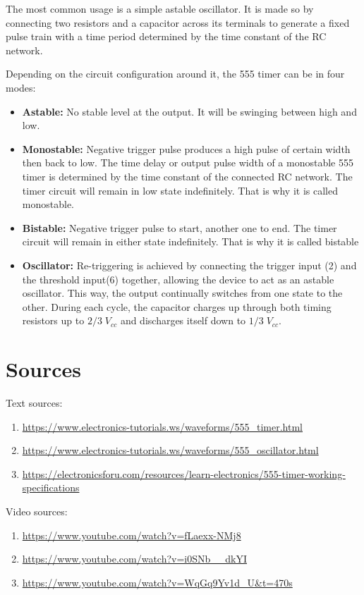 \documentclass[12pt]{extarticle}
\begin{document}
The most common usage is a simple astable oscillator. It is made so by connecting two resistors and a capacitor across its terminals to generate a fixed pulse train with a time period determined by the time constant of the RC network.

Depending on the circuit configuration around it, the 555 timer can be in four modes:
\begin{itemize}
  \item \textbf{Astable:} No stable level at the output. It will be swinging between high and low.
  \item \textbf{Monostable:} Negative trigger pulse produces a high pulse of certain width then back to low.
  The time delay or output pulse width of a monostable 555 timer is determined by the time constant of the connected RC network. The timer circuit will remain in low state indefinitely. That is why it is called monostable.
  \item \textbf{Bistable:} Negative trigger pulse to start, another one to end. The timer circuit will remain in either state indefinitely. That is why it is called bistable
  \item \textbf{Oscillator:} Re-triggering is achieved by connecting the trigger input (2) and the threshold input(6) together, allowing the device to act as an astable oscillator. This way, the output continually switches from one state to the other. During each cycle, the capacitor charges up through both timing resistors up to $2/3\;V_{cc}$ and discharges itself down to $1/3\;V_{cc}$.
\end{itemize}

\section{Sources}
Text sources:
\begin{enumerate}[label=(\Alph*)]
  \item \url{https://www.electronics-tutorials.ws/waveforms/555_timer.html}
  \item \url{https://www.electronics-tutorials.ws/waveforms/555_oscillator.html}
  \item \url{https://electronicsforu.com/resources/learn-electronics/555-timer-working-specifications}
\end{enumerate}
Video sources:
\begin{enumerate}[label=(\Alph*)]
  \item \url{https://www.youtube.com/watch?v=fLaexx-NMj8}
  \item \url{https://www.youtube.com/watch?v=i0SNb__dkYI}
  \item \url{https://www.youtube.com/watch?v=WqGq9Yv1d_U&t=470s}
\end{enumerate}
\end{document}
